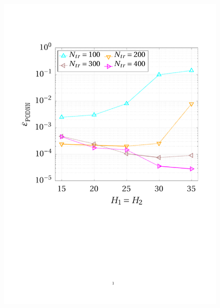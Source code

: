 \documentclass[longtitle]{elsarticle}
\numberwithin{equation}{section}
\theoremstyle{theorem}
\theoremstyle{definition}
\theoremstyle{remark}
\theoremstyle{proposition}
\numberwithin{figure}{section}
\begin{document}
		\begin{figure}[t!]
			\center
			\includegraphics[scale = 0.3, trim = {1cm 9.8cm 1.5cm 3.5cm}, clip]{poisson1d_nn_convergence}
			\hspace*{0.3cm}

\end{figure}
\end{document}
